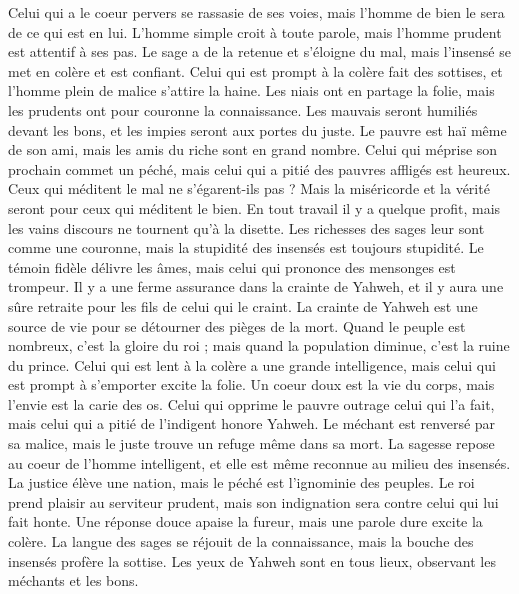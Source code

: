 \begin{multicols}{2}
Celui qui a le coeur pervers se rassasie de ses voies, mais l'homme de bien le sera de ce qui est en lui.
L’homme simple croit à toute parole, mais l'homme prudent est attentif à ses pas.
Le sage a de la retenue et s’éloigne du mal, mais l’insensé se met en colère et est confiant.
Celui qui est prompt à la colère fait des sottises, et l'homme plein de malice s’attire la haine.
Les niais ont en partage la folie, mais les prudents ont pour couronne la connaissance.
Les mauvais seront humiliés devant les bons, et les impies seront aux portes du juste.
Le pauvre est haï même de son ami, mais les amis du riche sont en grand nombre.
Celui qui méprise son prochain commet un péché, mais celui qui a pitié des pauvres affligés est heureux.
Ceux qui méditent le mal ne s’égarent-ils pas ? Mais la miséricorde et la vérité seront pour ceux qui méditent le bien.
En tout travail il y a quelque profit, mais les vains discours ne tournent qu'à la disette.
Les richesses des sages leur sont comme une couronne, mais la stupidité des insensés est toujours stupidité.
Le témoin fidèle délivre les âmes, mais celui qui prononce des mensonges est trompeur.
Il y a une ferme assurance dans la crainte de Yahweh, et il y aura une sûre retraite pour les fils de celui qui le craint.
La crainte de Yahweh est une source de vie pour se détourner des pièges de la mort.
Quand le peuple est nombreux, c’est la gloire du roi ; mais quand la population diminue, c'est la ruine du prince.
Celui qui est lent à la colère a une grande intelligence, mais celui qui est prompt à s’emporter excite la folie.
Un coeur doux est la vie du corps, mais l'envie est la carie des os.
Celui qui opprime le pauvre outrage celui qui l'a fait, mais celui qui a pitié de l’indigent honore Yahweh.
Le méchant est renversé par sa malice, mais le juste trouve un refuge même dans sa mort.
La sagesse repose au coeur de l'homme intelligent, et elle est même reconnue au milieu des insensés.
La justice élève une nation, mais le péché est l'ignominie des peuples.
Le roi prend plaisir au serviteur prudent, mais son indignation sera contre celui qui lui fait honte.
\VerseOne{}Une réponse douce apaise la fureur, mais une parole dure excite la colère.
La langue des sages se réjouit de la connaissance, mais la bouche des insensés profère la sottise.
Les yeux de Yahweh sont en tous lieux, observant les méchants et les bons.

\end{multicols}
